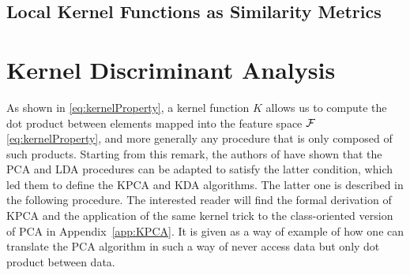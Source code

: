 \subsection{Local Kernel Functions as Similarity Metrics}

\section{Kernel Discriminant Analysis}
As shown in \ref{eq:kernelProperty}, a kernel function $K$ allows us to compute the dot product between elements mapped into the feature space $\mathcal{F}$ \eqref{eq:kernelProperty}, and more generally any procedure that is only composed of such products. Starting from this remark, the authors of  \cite{scholkopf1998nonlinear} have shown that the PCA and LDA procedures can be adapted to satisfy the latter condition, which led them to define the KPCA and KDA algorithms. The latter one is described in the following procedure. The interested reader will find the formal derivation of KPCA and the application of the same kernel trick to the class-oriented version of PCA in Appendix~\ref{app:KPCA}. It is given as a way of example of how one can translate the PCA algorithm in such a way of never access data but only dot product between data.

